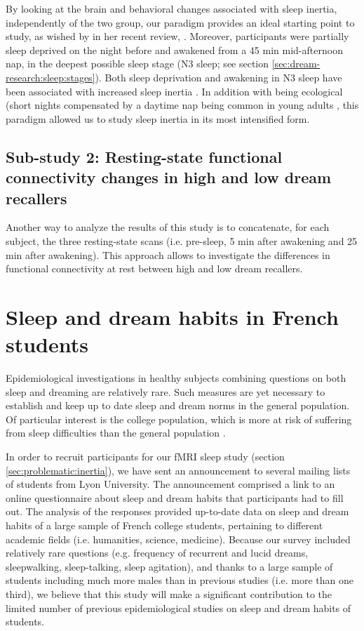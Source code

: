 By looking at the brain and behavioral changes associated with sleep inertia, independently of the two group, our paradigm provides an ideal starting point to study, as wished by \citet{trotti_waking_2016} in her recent review, . Moreover, participants were partially sleep deprived on the night before and awakened from a 45 min mid-afternoon nap, in the deepest possible sleep stage (N3 sleep; see section \ref{sec:dream-research:sleep:stages}). Both sleep deprivation and awakening in N3 sleep have been associated with increased sleep inertia \citep{tassi_sleep_2000}. In addition with being ecological (short nights compensated by a daytime nap being common in young adults \citep{faraut_napping:_2016}, this paradigm allowed us to study sleep inertia in its most intensified form.

\subsection{Sub-study 2: Resting-state functional connectivity changes in high and low dream recallers}
\label{sec:problematic:inertia:resting-drf}

Another way to analyze the results of this study is to concatenate, for each subject, the three resting-state scans (i.e. pre-sleep, 5 min after awakening and 25 min after awakening). This approach allows to investigate the differences in functional connectivity at rest between high and low dream recallers.


\section{Sleep and dream habits in French students}
\label{sec:problematic:survey}

Epidemiological investigations in healthy subjects combining questions on both sleep and dreaming are relatively rare. Such measures are yet necessary to establish and keep up to date sleep and dream norms in the general population. Of particular interest is the college population, which is more at risk of suffering from sleep difficulties than the general population \citep{buboltz_sleep_2001, curcio_sleep_2006, forquer_sleep_2008, lund_sleep_2010}.

In order to recruit participants for our fMRI sleep study (section \ref{sec:problematic:inertia}), we have sent an announcement to several mailing lists of students from Lyon University. The announcement comprised a link to an online questionnaire about sleep and dream habits that participants had to fill out. The analysis of the responses provided up-to-date data on sleep and dream habits of a large sample of French college students, pertaining to different academic fields (i.e. humanities, science, medicine). Because our survey included relatively rare questions (e.g. frequency of recurrent and lucid dreams, sleepwalking, sleep-talking, sleep agitation), and thanks to a large sample of students including much more males than in previous studies (i.e. more than one third), we believe that this study will make a significant contribution to the limited number of previous epidemiological studies on sleep and dream habits of students.


